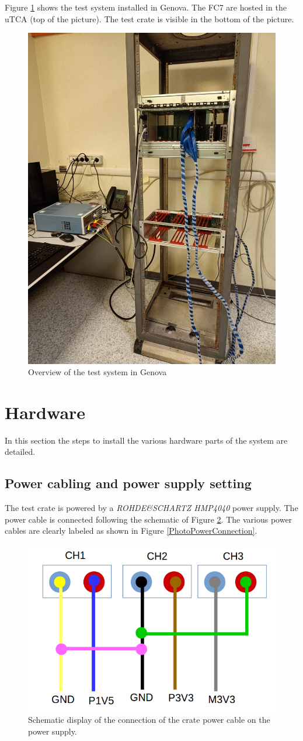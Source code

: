 \documentclass[10pt,a4paper]{article}
\begin{document}
Figure \ref{PhotoTestSystem} shows the test system installed in Genova. The FC7 are hosted in the uTCA (top of the picture). The test crate is visible in the bottom of the picture.

\begin{figure}[h!]
\centering
 \includegraphics[width=0.5\linewidth]{TestSystem.jpeg} 
  \caption{Overview of the test system in Genova}
  \label{PhotoTestSystem}
\end{figure}

\section{Hardware}
In this section the steps to install the various hardware parts of the system are detailed.
\subsection{Power cabling and power supply setting}
The test crate is powered by a \emph{ROHDE\&SCHARTZ HMP4040} power supply. The power cable is connected following the schematic of Figure \ref{PowerConnection}. The various power cables are clearly labeled as shown in Figure \ref{PhotoPowerConnection}.
\begin{figure}[h!]
\centering
 \includegraphics[width=0.7\linewidth]{ElectricalPower.png} 
  \caption{Schematic display of the connection of the crate power cable on the power supply.}
  \label{PowerConnection}
\end{figure}
\end{document}
